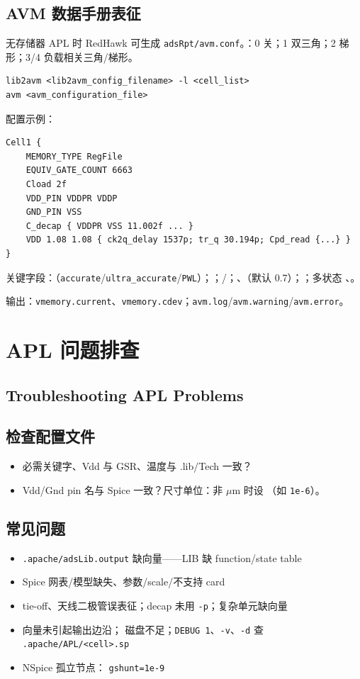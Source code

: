 \subsection{AVM 数据手册表征}
无存储器 APL 时 RedHawk 可生成 \texttt{adsRpt/avm.conf}。：0 关；1 双三角；2 梯形；3/4 负载相关三角/梯形。

\begin{lstlisting}
lib2avm <lib2avm_config_filename> -l <cell_list>
avm <avm_configuration_file>
\end{lstlisting}

配置示例：
\begin{lstlisting}
Cell1 {
    MEMORY_TYPE RegFile
    EQUIV_GATE_COUNT 6663
    Cload 2f
    VDD_PIN VDDPR VDDP
    GND_PIN VSS
    C_decap { VDDPR VSS 11.002f ... }
    VDD 1.08 1.08 { ck2q_delay 1537p; tr_q 30.194p; Cpd_read {...} }
}
\end{lstlisting}

关键字段：（\texttt{accurate}/\texttt{ultra\_accurate}/\texttt{PWL}）；；/；、（默认 0.7）；；多状态 、。

输出：\texttt{vmemory.current}、\texttt{vmemory.cdev}；\texttt{avm.log}/\texttt{avm.warning}/\texttt{avm.error}。

\section{APL 问题排查}
\subsection*{Troubleshooting APL Problems}

\subsection{检查配置文件}
\begin{itemize}
  \item 必需关键字、Vdd 与 GSR、温度与 .lib/Tech 一致？
  \item Vdd/Gnd pin 名与 Spice 一致？尺寸单位：非 $\mu$m 时设 （如 \texttt{1e-6}）。
\end{itemize}

\subsection{常见问题}
\begin{itemize}
  \item \texttt{.apache/adsLib.output} 缺向量——LIB 缺 function/state table
  \item Spice 网表/模型缺失、参数/scale/不支持 card
  \item tie-off、天线二极管误表征；decap 未用 \texttt{-p}；复杂单元缺向量
  \item 向量未引起输出边沿； 磁盘不足；\texttt{DEBUG 1}、\texttt{-v}、\texttt{-d} 查 \texttt{.apache/APL/<cell>.sp}
  \item NSpice 孤立节点： \texttt{gshunt=1e-9}
\end{itemize}

